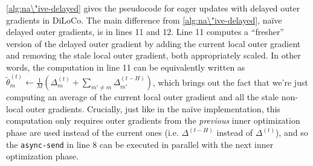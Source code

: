 

  
\autoref{alg:na\"ive-delayed} gives the pseudocode for eager updates with delayed outer gradients in DiLoCo. The main difference from \autoref{alg:na\"ive-delayed}, na\"ive delayed outer gradients, is in lines 11 and 12. Line 11 computes a ``fresher'' version of the delayed outer gradient by adding the current local outer gradient and removing the stale local outer gradient, both appropriately scaled. In other words, the computation in line 11 can be equivalently written as $\tilde{\theta}_m^{(t)} \gets \frac{1}{M}(\Delta_m^{(t)} + \sum_{m' \neq m} \Delta_{m'}^{(t-H)})$, which brings out the fact that we're just computing an average of the current local outer gradient and all the stale non-local outer gradients. Crucially, just like in the na\"ive implementation, this computation only requires outer gradients from the \emph{previous} inner optimization phase are used instead of the current ones (i.e. $\Delta^{(t-H)}$ instead of $\Delta^{(t)}$), and so the \texttt{async-send} in line 8 can be executed in parallel with the next inner optimization phase.



